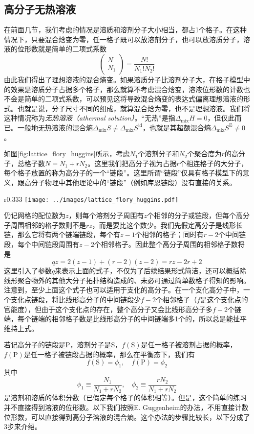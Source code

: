 \documentclass[main.tex]{subfiles}
\begin{document}
\subsection{高分子无热溶液}
在前面几节，我们考虑的情况是溶质和溶剂分子大小相当，都占1个格子。在这种情况下，只要混合焓变为零，任一格子既可以放溶剂分子，也可以放溶质分子，溶液的位形数就是简单的二项式系数
\[\left(\begin{array}{cc}N\\N_1\end{array}\right)=\frac{N!}{N_1!N_2!}\]
由此我们得出了理想溶液的混合熵变。如果溶质分子比溶剂分子大，在格子模型中的效果是溶质分子占据多个格子，那么就算不考虑混合焓变，溶液位形数的计数也不会是简单的二项式系数，可以预见这将导致混合熵变的表达式偏离理想溶液的形式。也就是说，分子尺寸不同的组成，就算混合焓为零，也不是理想溶液。我们将这种情况称为\emph{无热溶液（athermal solution）}。“无热”是指$\Delta_\text{mix}H=0$，但仅此而已。一般地无热溶液的混合熵$\Delta_\text{mix}S\neq\Delta_\text{mix}S^\text{id}$，也就是其超额混合熵$\Delta_\text{mix}S^\text{E}\neq 0$。

如图\ref{fig:lattice_flory_huggins}所示，考虑$N_1$个溶剂分子和$N_2$个聚合度为$r$的高分子，总格子数$N=N_1+rN_2$。这里我们把高分子视为占据$r$个相连格子的大分子，每个格子放置的称为高分子的一个“链段”。这里所谓“链段”仅具有格子模型下的意义，跟高分子物理中其他理论中的“链段”（例如库恩链段）没有直接的关系。
\begin{wrapfigure}{r}{0.333\textwidth}
  \centering
  \texttt{[image: ../images/lattice\_flory\_huggins.pdf]}
  \caption{一条高分子链的链段在网格中的一种放置方式。}
  \label{fig:lattice_flory_huggins}
\end{wrapfigure}
仍记网格的配位数为$z$，则每个溶剂分子周围有$z$个相邻的分子或链段，但每个高分子周围相邻的格子数则不是$rz$，而是要比这个数少。我们先假定高分子是线形长链，那么它将有两个链端链段，每个有$z-1$个相邻的格子；同时有$r-2$个中间链段，每个中间链段周围有$z-2$个相邻格子。因此整个高分子周围的相邻格子数将是
\[qz=2\left(z-1\right)+\left(r-2\right)\left(z-2\right)=rz-2r+2\]
这里引入了参数$q$来表示上面的式子，不仅为了后续结果形式简洁，还可以概括除线形聚合物外的其他大分子拓扑结构造成的、未必可通过简单数格子得知的影响。注意到，至少上面这个式子也可以适用于支化的高分子。在一个支化高分子中，一个支化点链段，将比线形高分子的中间链段少$f-2$个相邻格子（$f$是这个支化点的官能度），但由于这个支化点的存在，整个高分子又会比线形高分子多$f-2$个链端，每个链端的相邻格子数是比线形高分子的中间链端多1个的，所以总是能扯平维持上式。

若记高分子的链段是P，溶剂分子是S，$f\left(\text{S}\right)$是任一格子被溶剂占据的概率，$f\left(\text{P}\right)$是任一格子被链段占据的概率，那么在平衡态下，我们有
\[f\left(\text{S}\right)=\phi_1,\quad f\left(\text{P}\right)=\phi_2\]
其中
\[\phi_1\equiv\frac{N_1}{N_1+rN_2},\quad\phi_2\equiv\frac{rN_2}{N_1+rN_2}\]
是溶剂和溶质的体积分数（已假定每个格子的体积相等）。但是，这个简单的练习并不直接得到溶液的位形数。以下我们按照E. Guggenheim的办法\cite{Guggenheim1952,Tompa1956}，不用直接计数位形数，可以直接得到高分子溶液的混合熵。这个办法的步骤比较长，以下分成了3步来介绍。
\end{document}
